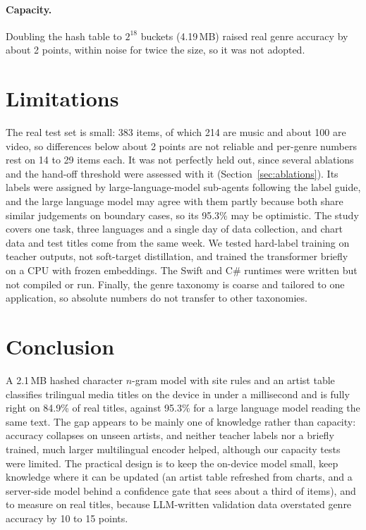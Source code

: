 \documentclass[11pt]{article}
\begin{document}
\paragraph{Capacity.} Doubling the hash table to $2^{18}$ buckets (4.19\,MB) raised real genre accuracy by about 2 points, within noise for twice the size, so it was not adopted.

\section{Limitations}
\label{sec:limitations}

The real test set is small: 383 items, of which 214 are music and about 100 are video, so differences below about 2 points are not reliable and per-genre numbers rest on 14 to 29 items each. It was not perfectly held out, since several ablations and the hand-off threshold were assessed with it (Section~\ref{sec:ablations}). Its labels were assigned by large-language-model sub-agents following the label guide, and the large language model may agree with them partly because both share similar judgements on boundary cases, so its 95.3\% may be optimistic. The study covers one task, three languages and a single day of data collection, and chart data and test titles come from the same week. We tested hard-label training on teacher outputs, not soft-target distillation, and trained the transformer briefly on a CPU with frozen embeddings. The Swift and C\# runtimes were written but not compiled or run. Finally, the genre taxonomy is coarse and tailored to one application, so absolute numbers do not transfer to other taxonomies.

\section{Conclusion}
\label{sec:conclusion}

A 2.1\,MB hashed character $n$-gram model with site rules and an artist table classifies trilingual media titles on the device in under a millisecond and is fully right on 84.9\% of real titles, against 95.3\% for a large language model reading the same text. The gap appears to be mainly one of knowledge rather than capacity: accuracy collapses on unseen artists, and neither teacher labels nor a briefly trained, much larger multilingual encoder helped, although our capacity tests were limited. The practical design is to keep the on-device model small, keep knowledge where it can be updated (an artist table refreshed from charts, and a server-side model behind a confidence gate that sees about a third of items), and to measure on real titles, because LLM-written validation data overstated genre accuracy by 10 to 15 points.
\end{document}

